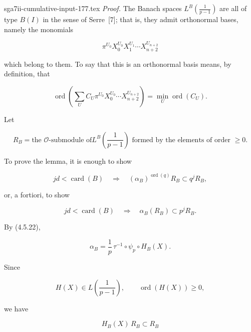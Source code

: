 \begin{filecontents*}{sga7ii-cumulative-input-177.tex}
\noindent\emph{Proof.}
The Banach spaces
$L^B\!\left(\frac1{p-1}\right)$ are all of type $B(I)$ in the sense of
Serre~[7]; that is, they admit orthonormal bases, namely the monomials

\begin{equation}\tag{4.6.9}
\pi^{U_0}X_0^{U_0}X_1^{U_1}\cdots X_{n+2}^{U_{n+2}}
\end{equation}

\noindent
which belong to them.  To say that this is an orthonormal basis means, by
definition, that

\begin{equation}\tag{4.6.10}
\operatorname{ord}\!\left(
\sum_U C_U\pi^{U_0}X_0^{U_0}\cdots X_{n+2}^{U_{n+2}}
\right)
=\min_U\operatorname{ord}(C_U).
\end{equation}

Let

\begin{equation}\tag{4.6.11}
R_B=\text{the $\mathcal O$-submodule of
$L^B\!\left(\frac1{p-1}\right)$ formed by the elements of order $\geq0$}.
\end{equation}

To prove the lemma, it is enough to show

\begin{equation}\tag{4.6.12}
jd<\operatorname{card}(B)
\quad\Longrightarrow\quad
(\alpha_B)^{\operatorname{ord}(q)}R_B\subset q^jR_B,
\end{equation}

or, a fortiori, to show

\begin{equation}\tag{4.6.13}
jd<\operatorname{card}(B)
\quad\Longrightarrow\quad
\alpha_B(R_B)\subset p^jR_B.
\end{equation}

By (4.5.22),

\begin{equation}\tag{4.6.14}
\alpha_B=\frac1p\,\tau^{-1}\circ\psi_p\circ H_B(X).
\end{equation}

Since

\begin{equation}\tag{4.6.15}
H(X)\in L\!\left(\frac1{p-1}\right),
\qquad \operatorname{ord}(H(X))\geq0,
\end{equation}

we have

\begin{equation}\tag{4.6.16}
H_B(X)\,R_B\subset R_B
\end{equation}


\end{filecontents*}
